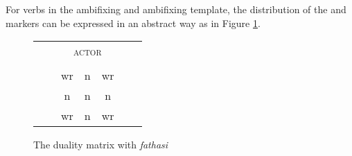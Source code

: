 For verbs in the  ambifixing and  ambifixing template, the distribution of the  and  markers can be expressed in an abstract way as in Figure \ref{dualitymatrixfathasi}.
\vspace{-.1cm}
\begin{figure}[H]
\centering
	\begin{tabular}{|ccccccc|}
		\cline{3-5}
		\multicolumn{2}{c|}{}&\multicolumn{3}{c|}{\textsc{actor}}&\\\cline{3-5}
		\multicolumn{2}{c|}{}&\multicolumn{1}{c}{\Sg}&\multicolumn{1}{|c|}{\Du}&\multicolumn{1}{c|}{\Pl}&\\\cline{1-5}
		{\parbox[t]{2mm}{}}&\multicolumn{1}{|c|}{\parbox[t]{2mm}{}}&\multicolumn{1}{c}{\multirow{2}{*}{\hspace{0,1cm}wr\hspace{0,1cm}}}	&\multirow{2}{*}{\hspace{0,1cm}n\hspace{0,1cm}}	&\multicolumn{1}{c|}{\multirow{2}{*}{\hspace{0,1cm}wr\hspace{0,1cm}}}&\\
		&\multicolumn{1}{|c|}{}&&&\multicolumn{1}{c|}{}\\\cline{2-2}
		&\multicolumn{1}{|c|}{\parbox[t]{2mm}{}}&\multicolumn{1}{c}{\multirow{2}{*}{\hspace{0,1cm}n\hspace{0,1cm}}}&\multirow{2}{*}{\hspace{0,1cm}n\hspace{0,1cm}}&\multicolumn{1}{c|}{\multirow{2}{*}{\hspace{0,1cm}n\hspace{0,1cm}}}&\\
		&\multicolumn{1}{|c|}{}&&&\multicolumn{1}{c|}{}\\\cline{2-2}
		&\multicolumn{1}{|c|}{\parbox[t]{2mm}{}}&\multicolumn{1}{c}{\multirow{2}{*}{\hspace{0,1cm}wr\hspace{0,1cm}}}&\multirow{2}{*}{\hspace{0,1cm}n\hspace{0,1cm}}&\multicolumn{1}{c|}{\multirow{2}{*}{\hspace{0,1cm}wr\hspace{0,1cm}}}&\\
		&\multicolumn{1}{|c|}{}&&&\multicolumn{1}{c|}{}\\\cline{1-5}
	\end{tabular}
\caption{The duality matrix with \emph{fathasi}}
\label{dualitymatrixfathasi}
\end{figure}%

